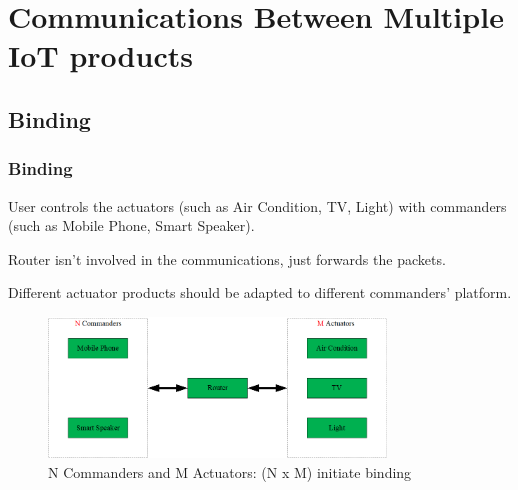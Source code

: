 \documentclass{ctexbeamer}
\begin{document}
\section{Communications Between Multiple IoT products}

\subsection{Binding}
\begin{frame}
\frametitle{Binding}

User controls the actuators (such as Air Condition, TV, Light) with commanders (such as Mobile Phone, Smart Speaker).

Router isn't involved in the communications, just forwards the packets. 

Different actuator products should be adapted to different commanders' platform.

    \begin{figure}[H]
        \centering 
        \includegraphics[width=0.8\textwidth]{pic/smart_home.png} 
        \caption{N Commanders and M Actuators: (N x M) initiate binding} 
        \label{fig.smart.home}
    \end{figure}

\end{frame}
\end{document}
